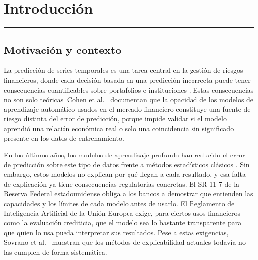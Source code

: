 \chapter{Introducción}
\hrule \bigskip \vspace*{1cm}

\label{sec:introduccion}

\section{Motivación y contexto}

La predicción de series temporales es una tarea central en la gestión de riesgos financieros, donde cada decisión basada en una predicción incorrecta puede tener consecuencias cuantificables sobre portafolios e instituciones \cite{arsenault2025}. Estas consecuencias no son solo teóricas. Cohen et al.\ \cite{cohen2023blackbox} documentan que la opacidad de los modelos de aprendizaje automático usados en el mercado financiero constituye una fuente de riesgo distinta del error de predicción, porque impide validar si el modelo aprendió una relación económica real o solo una coincidencia sin significado presente en los datos de entrenamiento.

En los últimos años, los modelos de aprendizaje profundo han reducido el error de predicción sobre este tipo de datos frente a métodos estadísticos clásicos \cite{bhandari2022, abdulquadir2023}. Sin embargo, estos modelos no explican por qué llegan a cada resultado, y esa falta de explicación ya tiene consecuencias regulatorias concretas. El SR 11-7 de la Reserva Federal estadounidense \cite{sr117} obliga a los bancos a demostrar que entienden las capacidades y los límites de cada modelo antes de usarlo. El Reglamento de Inteligencia Artificial de la Unión Europea \cite{euaiact2024} exige, para ciertos usos financieros como la evaluación crediticia, que el modelo sea lo bastante transparente para que quien lo usa pueda interpretar sus resultados. Pese a estas exigencias, Sovrano et al.\ \cite{sovrano2026} muestran que los métodos de explicabilidad actuales todavía no las cumplen de forma sistemática.

